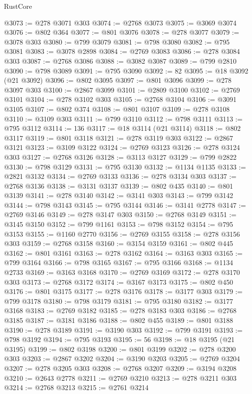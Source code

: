 \begin{lexlean}{RustCore}
\begin{coremodule}
@3073 := @278 @3071 @303
@3074 := @2768 @3073
@3075 := @3069 @3074
@3076 := @802 @364
@3077 := @801 @3076
@3078 := @278 @3077
@3079 := @3078 @303
@3080 := @799 @3079
@3081 := @798 @3080
@3082 := @795 @3081
@3083 := @3078 @2898
@3084 := @2769 @3083
@3086 := @278 @3084 @303
@3087 := @2768 @3086
@3088 := @3082 @3087
@3089 := @799 @2810
@3090 := @798 @3089
@3091 := @795 @3090
@3092 := 82
@3095 := @18 @3092 (@21 @3092)
@3096 := @802 @3095
@3097 := @801 @3096
@3099 := @278 @3097 @303
@3100 := @2867 @3099
@3101 := @2809 @3100
@3102 := @2769 @3101
@3104 := @278 @3102 @303
@3105 := @2768 @3104
@3106 := @3091 @3105
@3107 := @802 @374
@3108 := @801 @3107
@3109 := @278 @3108
@3110 := @3109 @303
@3111 := @799 @3110
@3112 := @798 @3111
@3113 := @795 @3112
@3114 := 136
@3117 := @18 @3114 (@21 @3114)
@3118 := @802 @3117
@3119 := @801 @3118
@3121 := @278 @3119 @303
@3122 := @2867 @3121
@3123 := @3109 @3122
@3124 := @2769 @3123
@3126 := @278 @3124 @303
@3127 := @2768 @3126
@3128 := @3113 @3127
@3129 := @799 @2822
@3130 := @798 @3129
@3131 := @795 @3130
@3132 := @1134 @1135
@3133 := @2821 @3132
@3134 := @2769 @3133
@3136 := @278 @3134 @303
@3137 := @2768 @3136
@3138 := @3131 @3137
@3139 := @802 @435
@3140 := @801 @3139
@3141 := @278 @3140
@3142 := @3141 @303
@3143 := @799 @3142
@3144 := @798 @3143
@3145 := @795 @3144
@3146 := @3141 @2778
@3147 := @2769 @3146
@3149 := @278 @3147 @303
@3150 := @2768 @3149
@3151 := @3145 @3150
@3152 := @799 @1161
@3153 := @798 @3152
@3154 := @795 @3153
@3155 := @1160 @2770
@3156 := @2769 @3155
@3158 := @278 @3156 @303
@3159 := @2768 @3158
@3160 := @3154 @3159
@3161 := @802 @445
@3162 := @801 @3161
@3163 := @278 @3162
@3164 := @3163 @303
@3165 := @799 @3164
@3166 := @798 @3165
@3167 := @795 @3166
@3168 := @1134 @2733
@3169 := @3163 @3168
@3170 := @2769 @3169
@3172 := @278 @3170 @303
@3173 := @2768 @3172
@3174 := @3167 @3173
@3175 := @802 @450
@3176 := @801 @3175
@3177 := @278 @3176
@3178 := @3177 @303
@3179 := @799 @3178
@3180 := @798 @3179
@3181 := @795 @3180
@3182 := @3177 @3168
@3183 := @2769 @3182
@3185 := @278 @3183 @303
@3186 := @2768 @3185
@3187 := @3181 @3186
@3188 := @802 @455
@3189 := @801 @3188
@3190 := @278 @3189
@3191 := @3190 @303
@3192 := @799 @3191
@3193 := @798 @3192
@3194 := @795 @3193
@3195 := 56
@3198 := @18 @3195 (@21 @3195)
@3199 := @802 @3198
@3200 := @801 @3199
@3202 := @278 @3200 @303
@3203 := @2867 @3202
@3204 := @3190 @3203
@3205 := @2769 @3204
@3207 := @278 @3205 @303
@3208 := @2768 @3207
@3209 := @3194 @3208
@3210 := @2643 @2778
@3211 := @2769 @3210
@3213 := @278 @3211 @303
@3214 := @2768 @3213
@3215 := @2761 @3214

\end{coremodule}
\end{lexlean}
